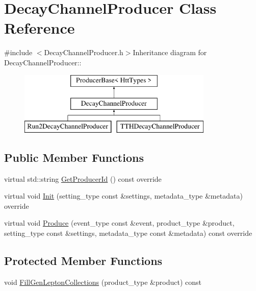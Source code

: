 \hypertarget{classDecayChannelProducer}{
\section{DecayChannelProducer Class Reference}
\label{classDecayChannelProducer}
}


{\ttfamily \#include $<$DecayChannelProducer.h$>$}Inheritance diagram for DecayChannelProducer::\begin{figure}[H]
\begin{center}
\leavevmode
\includegraphics[height=3cm]{classDecayChannelProducer}
\end{center}
\end{figure}
\subsection*{Public Member Functions}
\begin{DoxyCompactItemize}
\item 
virtual std::string \hyperlink{classDecayChannelProducer_a151b0b47507bc8e521fe9acab96d38bc}{GetProducerId} () const override
\item 
virtual void \hyperlink{classDecayChannelProducer_a5876d5fbfeb50e57f802d2f334a1bf4b}{Init} (setting\_\-type const \&settings, metadata\_\-type \&metadata) override
\item 
virtual void \hyperlink{classDecayChannelProducer_a0e10edeaa5e3ae64023b521237f50003}{Produce} (event\_\-type const \&event, product\_\-type \&product, setting\_\-type const \&settings, metadata\_\-type const \&metadata) const override
\end{DoxyCompactItemize}
\subsection*{Protected Member Functions}
\begin{DoxyCompactItemize}
\item 
void \hyperlink{classDecayChannelProducer_a6f207dff7857e0c2bacdca16ca9cea80}{FillGenLeptonCollections} (product\_\-type \&product) const 
\end{DoxyCompactItemize}
